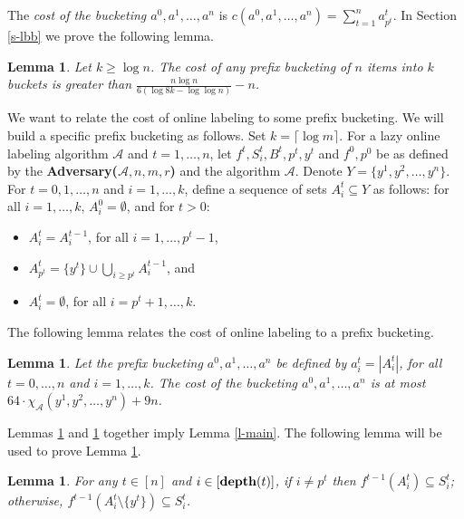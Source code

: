 \documentclass[11pt]{article}
\newtheorem{lemma}[theorem]{Lemma}
\newcommand{\A}{\mathcal{A}}
\newcommand{\depth}{{\rm {\bf depth}}}
\begin{document}
The \emph{cost of the bucketing $a^0,a^1,\dotsc,a^n$} is $c(a^0,a^1,\dotsc,a^n) = \sum_{t=1}^n a^t_{p^{t}}$. In Section \ref{s-lbb}
we prove the following lemma.

\begin{lemma}\label{l-lbb}
Let $k \ge \log n$.
The cost of any prefix bucketing of $n$ items into $k$ buckets is greater than $\frac{n \log n}{6 (\log 8k - \log \log n)} - n$.
\end{lemma}

We want to relate the cost of online labeling to some prefix bucketing. We will build a specific prefix
bucketing as follows. Set $k=\lceil \log m\rceil$.
For a lazy online labeling algorithm $\A$ and $t=1,\dotsc,n$, let $f^t,S^t_i,B^t,p^{t},y^t$ and $f^0,p^0$ be as
defined by the {\bf Adversary($\A,n,m,r$)} and the algorithm $\A$. Denote $Y=\{y^1,y^2,\dotsc,y^n\}$.
For $t=0,1,\dotsc,n$ and $i=1,\dotsc,k$, define a sequence of sets $A^t_i \subseteq Y$ as follows:
for all $i=1,\dotsc,k$, $A^0_i = \emptyset$, and for $t>0$:
\begin{itemize}
\item $A^t_i = A^{t-1}_i$, for all $i=1,\dotsc,p^{t}-1$,
\item $A^t_{p^{t}} = \{y^t\} \cup \bigcup_{i\ge p^{t}} A^{t-1}_i$, and
\item $A^t_i = \emptyset$, for all $i=p^{t}+1,\dotsc, k$.
\end{itemize}

The following lemma relates the cost of online labeling to a prefix bucketing.

\begin{lemma}\label{l-b2l}
Let the prefix bucketing $a^0,a^1,\dotsc,a^n$ be defined by $a^t_i = |A^t_i|$, for all $t=0,\dotsc,n$ and $i=1,\dotsc,k$.
The cost of the bucketing $a^0,a^1,\dotsc,a^n$ is at most $64 \cdot \chi_\A(y^1,y^2,\dotsc,y^n) + 9n$.
\end{lemma}

Lemmas \ref{l-lbb} and \ref{l-b2l} together imply Lemma \ref{l-main}. The following lemma will be used to prove Lemma  \ref{l-b2l}.

\begin{lemma}\label{l-p2}
For any $t\in[n]$ and $i\in [\depth(t)]$,  if $i\not=p^t$ then $f^{t-1}(A^t_i) \subseteq S^t_i$; otherwise,
$f^{t-1}(A^t_i \setminus \{y^t\}) \subseteq S^t_i$.
\end{lemma}
\end{document}
